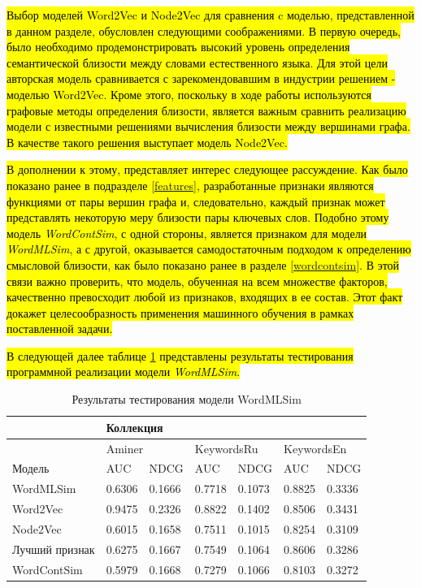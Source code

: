 \hl{Выбор моделей Word2Vec и Node2Vec для сравнения c моделью, представленной в данном разделе, обусловлен следующими соображениями. В первую очередь, было необходимо продемонстрировать высокий уровень определения семантической близости между словами естественного языка. Для этой цели авторская модель сравнивается с зарекомендовавшим в индустрии решением - моделью Word2Vec. Кроме этого, поскольку в ходе работы используются графовые методы определения близости, является важным сравнить реализацию модели с известными решениями вычисления близости между вершинами графа. В качестве такого решения выступает модель Node2Vec.}

\hl{В дополнении к этому, представляет интерес следующее рассуждение. Как было показано ранее в подразделе \ref{features}, разработанные признаки являются функциями от пары вершин графа и, следовательно, каждый признак может представлять некоторую меру близости пары ключевых слов. Подобно этому модель \emph{WordContSim}, с одной стороны, является признаком для модели \emph{WordMLSim}, а с другой, оказывается самодостаточным подходом к определению смысловой близости, как было показано ранее в разделе \ref{wordcontsim}. В этой связи важно проверить, что модель, обученная на всем множестве факторов, качественно превосходит любой из признаков, входящих в ее состав. Этот факт докажет целесообразность применения машинного обучения в рамках поставленной задачи.}

\hl{В следующей далее таблице \ref{tbl:sim_res} представлены результаты тестирования программной реализации модели \emph{WordMLSim}.}


\begin{table}[htb]
\begin{tabular}{|l|l|l|l|l|l|l|}
\hline
               & \multicolumn{6}{l|}{Коллекция}                                                                  \\ \hline
               & \multicolumn{2}{l|}{Aminer} & \multicolumn{2}{l|}{KeywordsRu} & \multicolumn{2}{l|}{KeywordsEn} \\ \hline
Модель         & AUC          & NDCG         & AUC            & NDCG           & AUC            & NDCG           \\ \hline
WordMLSim      & 0.6306       & 0.1666       & 0.7718         & 0.1073         & 0.8825         & 0.3336         \\ \hline
Word2Vec       & 0.9475       & 0.2326       & 0.8822         & 0.1402         & 0.8506         & 0.3431         \\ \hline
Node2Vec       & 0.6015       & 0.1658       & 0.7511         & 0.1015         & 0.8254         & 0.3109         \\ \hline
Лучший признак & 0.6275       & 0.1667       & 0.7549         & 0.1064         & 0.8606         & 0.3286         \\ \hline
WordContSim    & 0.5979       & 0.1668       & 0.7279         & 0.1066         & 0.8103         & 0.3272         \\ \hline
\end{tabular}
\caption{Результаты тестирования модели WordMLSim} \label{tbl:sim_res}
\end{table}

